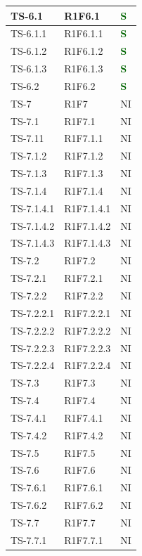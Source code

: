 \begin{longtable}{|C{2.5cm}|C{2.5cm}|C{2.5cm}|}
	\hline
	{TS-6.1} & {R1F6.1} & \textcolor{darkgreen}{\textbf{S}}\\
	\hline
	{TS-6.1.1} & {R1F6.1.1} & \textcolor{darkgreen}{\textbf{S}}\\
	\hline
	{TS-6.1.2} & {R1F6.1.2} & \textcolor{darkgreen}{\textbf{S}}\\
	\hline
	{TS-6.1.3} & {R1F6.1.3}  & \textcolor{darkgreen}{\textbf{S}}\\
	\hline
	{TS-6.2} & {R1F6.2} & \textcolor{darkgreen}{\textbf{S}}\\
	\hline
	{TS-7} & {R1F7} & {NI}\\
	\hline
	{TS-7.1} & {R1F7.1} & {NI}\\
	\hline
	{TS-7.11} & {R1F7.1.1} & {NI}\\
	\hline
	{TS-7.1.2} & {R1F7.1.2} & {NI}\\
	\hline
	{TS-7.1.3} & {R1F7.1.3} & {NI}\\
	\hline
	{TS-7.1.4} & {R1F7.1.4} & {NI}\\
	\hline
	{TS-7.1.4.1} & {R1F7.1.4.1} & {NI}\\
	\hline
	{TS-7.1.4.2} & {R1F7.1.4.2} & {NI}\\
	\hline
	{TS-7.1.4.3} & {R1F7.1.4.3} & {NI}\\
	\hline
	{TS-7.2} & {R1F7.2} & {NI}\\
	\hline
	{TS-7.2.1} & {R1F7.2.1} & {NI}\\
	\hline
	{TS-7.2.2} & {R1F7.2.2} & {NI}\\
	\hline
	{TS-7.2.2.1} & {R1F7.2.2.1} & {NI}\\
	\hline
	{TS-7.2.2.2} & {R1F7.2.2.2} & {NI}\\
	\hline
	{TS-7.2.2.3} & {R1F7.2.2.3} & {NI}\\
	\hline
	{TS-7.2.2.4} & {R1F7.2.2.4} & {NI}\\
	\hline
	{TS-7.3} & {R1F7.3} & {NI}\\
	\hline
	{TS-7.4} & {R1F7.4} & {NI}\\
	\hline
	{TS-7.4.1} & {R1F7.4.1} & {NI}\\
	\hline
	{TS-7.4.2} & {R1F7.4.2} & {NI}\\
	\hline
	{TS-7.5} & {R1F7.5} & {NI}\\
	\hline
	{TS-7.6} & {R1F7.6} & {NI}\\
	\hline
	{TS-7.6.1} & {R1F7.6.1} & {NI}\\
	\hline
	{TS-7.6.2} & {R1F7.6.2} & {NI}\\
	\hline
	{TS-7.7} & {R1F7.7} & {NI}\\
	\hline
	{TS-7.7.1} & {R1F7.7.1} & {NI}\\

\end{longtable}
